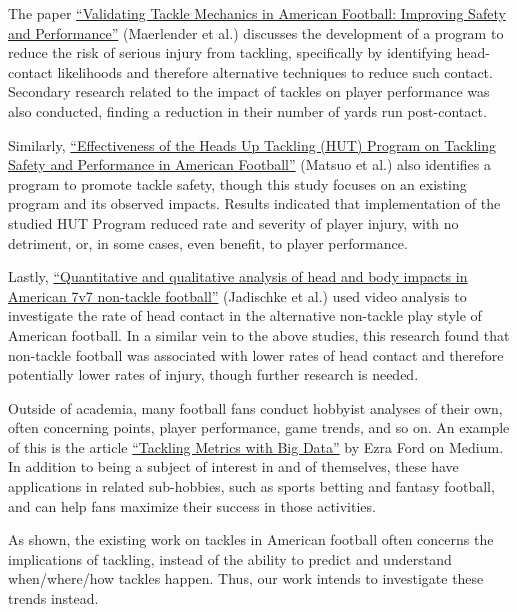 \documentclass[sigconf, hyperref={colorlinks=true,linkcolor=blue,urlcolor=blue}]{acmart}
\begin{document}
The paper \href{https://link.springer.com/article/10.1007/s10439-020-02625-7}{“Validating Tackle
Mechanics in American Football: Improving Safety and Performance”} (Maerlender et al.) discusses the
development of a program to reduce the risk of serious injury from tackling, specifically by identifying
head-contact likelihoods and therefore alternative techniques to reduce such contact. Secondary research
related to the impact of tackles on player performance was also conducted, finding a reduction in
their number of yards run post-contact.

Similarly, \href{https://www.jstage.jst.go.jp/article/ijshs/16/0/16_201804/_article/-char/ja/}
{“Effectiveness of the Heads Up Tackling (HUT) Program on Tackling Safety and Performance in American Football”}
(Matsuo et al.) also identifies a program to promote tackle safety, though this study focuses
on an existing program and its observed impacts. Results indicated that implementation of the
studied HUT Program reduced rate and severity of player injury, with no detriment, or, in some
cases, even benefit, to player performance.

Lastly, \href{https://bmjopensem.bmj.com/content/6/1/e000638.abstract}{“Quantitative and qualitative
analysis of head and body impacts in American 7v7 non-tackle football”} (Jadischke et al.) used video
analysis to investigate the rate of head contact in the alternative non-tackle play style of
American football. In a similar vein to the above studies, this research found that non-tackle
football was associated with lower rates of head contact and therefore potentially lower rates of
injury, though further research is needed.

Outside of academia, many football fans conduct hobbyist analyses of their own, often
concerning points, player performance, game trends, and so on. An example of this is
the article \href{https://medium.com/@ezra.ford/tackling-metrics-with-big-data-0812b5ab65f0}{“Tackling Metrics with Big Data”}
by Ezra Ford on Medium. In addition to being a subject of interest in and of themselves,
these have applications in related sub-hobbies, such as sports betting and fantasy football,
and can help fans maximize their success in those activities.

As shown, the existing work on tackles in American football often concerns the implications of
tackling, instead of the ability to predict and understand when/where/how tackles happen.
Thus, our work intends to investigate these trends instead.
\end{document}
